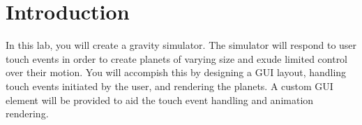 \section{Introduction}

In this lab, you will create a gravity simulator.
The simulator will respond to user touch events in order to create planets of varying size and exude limited control over their motion.
You will accompish this by designing a GUI layout, handling touch events initiated by the user, and rendering the planets.
A custom GUI element will be provided to aid the touch event handling and animation rendering.